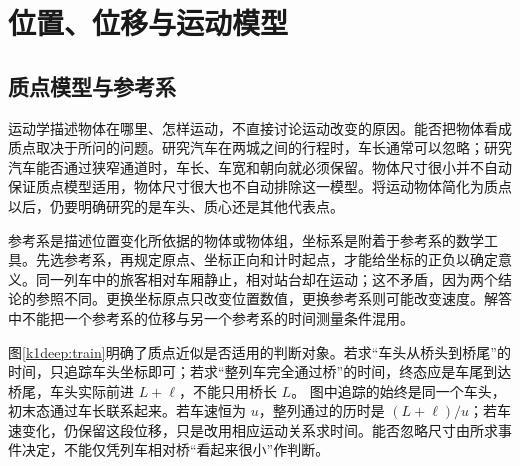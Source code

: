\section{位置、位移与运动模型}
\subsection{质点模型与参考系}
运动学描述物体在哪里、怎样运动，不直接讨论运动改变的原因。能否把物体看成质点取决于所问的问题。研究汽车在两城之间的行程时，车长通常可以忽略；研究汽车能否通过狭窄通道时，车长、车宽和朝向就必须保留。物体尺寸很小并不自动保证质点模型适用，物体尺寸很大也不自动排除这一模型。将运动物体简化为质点以后，仍要明确研究的是车头、质心还是其他代表点。

参考系是描述位置变化所依据的物体或物体组，坐标系是附着于参考系的数学工具。先选参考系，再规定原点、坐标正向和计时起点，才能给坐标的正负以确定意义。同一列车中的旅客相对车厢静止，相对站台却在运动；这不矛盾，因为两个结论的参照不同。更换坐标原点只改变位置数值，更换参考系则可能改变速度。解答中不能把一个参考系的位移与另一个参考系的时间测量条件混用。


图\ref{k1deep:train}明确了质点近似是否适用的判断对象。若求“车头从桥头到桥尾”的时间，只追踪车头坐标即可；若求“整列车完全通过桥”的时间，终态应是车尾到达桥尾，车头实际前进 $L+\ell$，不能只用桥长 $L$。
图中追踪的始终是同一个车头，初末态通过车长联系起来。若车速恒为 $u$，整列通过的历时是 $(L+\ell)/u$；若车速变化，仍保留这段位移，只是改用相应运动关系求时间。能否忽略尺寸由所求事件决定，不能仅凭列车相对桥“看起来很小”作判断。


